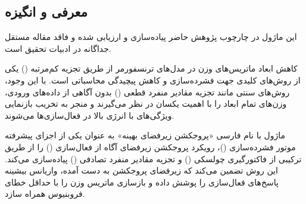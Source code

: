 \subsection{معرفی و انگیزه}
این ماژول در چارچوب پژوهش حاضر پیاده‌سازی و ارزیابی شده و فاقد مقاله مستقل جداگانه در ادبیات تحقیق است.

کاهش ابعاد ماتریس‌های وزن در مدل‌های ترنسفورمر از طریق تجزیه کم‌مرتبه () یکی از روش‌های کلیدی جهت فشرده‌سازی و کاهش پیچیدگی محاسباتی است. با این وجود، روش‌های سنتی مانند تجزیه مقادیر منفرد قطعی () بدون آگاهی از داده‌های ورودی، وزن‌های تمام ابعاد را با اهمیت یکسان در نظر می‌گیرند و منجر به تخریب بازنمایی ویژگی‌های با انرژی بالا در فعال‌سازی‌ها می‌شوند.

ماژول  با نام فارسی «پروجکشن زیرفضای بهینه» به عنوان یکی از اجزای پیشرفته موتور فشرده‌سازی ()، رویکرد پروجکشن زیرفضای آگاه از فعال‌سازی () را از طریق ترکیبی از فاکتورگیری چولسکی () و تجزیه مقادیر منفرد تصادفی () پیاده‌سازی می‌کند. این روش تضمین می‌کند که زیرفضای پروجکشن به دست آمده، واریانس بیشینه پاسخ‌های فعال‌سازی را پوشش داده و بازسازی ماتریس وزن را با حداقل خطای فروبنیوس همراه سازد.
